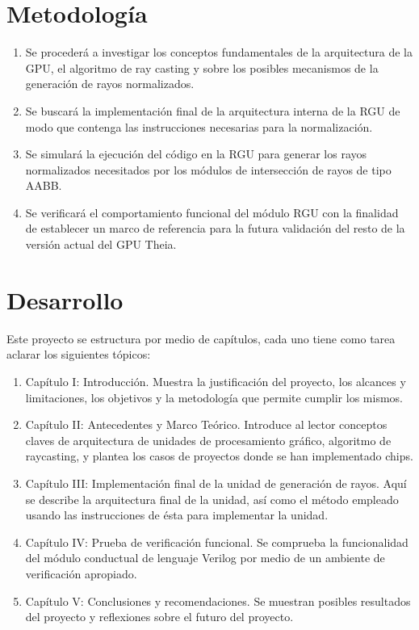 \section{Metodología}

\begin{enumerate}  %
	\item Se procederá a investigar los conceptos fundamentales de la arquitectura de la GPU, el algoritmo de ray casting y sobre los posibles mecanismos de la generación de rayos normalizados.
	\item Se buscará la implementación final de la arquitectura interna de la RGU de modo que contenga las instrucciones necesarias para la normalización.
	\item Se simulará la ejecución del código en la RGU para generar los rayos normalizados necesitados por los módulos de intersección de rayos de tipo AABB.
	\item Se verificará el comportamiento funcional del módulo RGU con la finalidad de establecer un marco de referencia para la futura validación del resto de la versión actual del GPU Theia.
\end{enumerate}


\section{Desarrollo}

Este proyecto se estructura por medio de capítulos, cada uno tiene como tarea aclarar los siguientes tópicos:

\begin{enumerate}

\item Capítulo I: Introducción. 
Muestra la justificación del proyecto, los alcances y limitaciones, los objetivos y la metodología que permite cumplir los mismos.

\item Capítulo II: Antecedentes y Marco Teórico. 
Introduce al lector conceptos claves de arquitectura de unidades de procesamiento gráfico, algoritmo de raycasting, y plantea los casos de proyectos donde se han implementado chips.

\item Capítulo III: Implementación final de la unidad de generación de rayos. Aquí se describe la arquitectura final de la unidad, así como el método empleado usando las instrucciones de ésta para implementar la unidad.

\item Capítulo IV: Prueba de verificación funcional. Se comprueba la funcionalidad del módulo conductual de lenguaje Verilog por medio de un ambiente de verificación apropiado.

\item Capítulo V: Conclusiones y recomendaciones. Se muestran posibles resultados del proyecto y reflexiones sobre el futuro del proyecto. 

\end{enumerate}